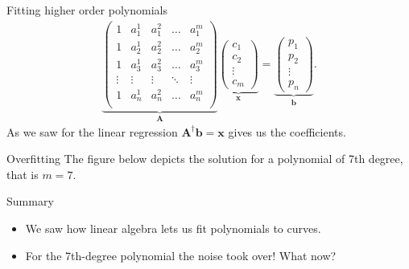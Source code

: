 \documentclass[notes]{beamer}
\begin{document}
    \begin{frame}{Fitting higher order polynomials}
      \begin{align}
        \underbrace{
        \begin{pmatrix}
          1       & a_1^1    & a_1^2  & \dots & a_1^m  \\ 
          1       & a_2^1    & a_2^2  & \dots & a_2^m  \\
          1       & a_3^1    & a_3^2  & \dots & a_3^m  \\
          \vdots  & \vdots    & \vdots  & \ddots & \vdots \\ 
          1       & a_n^1    & a_n^2  & \dots & a_n^m  \\
        \end{pmatrix}
        }_{\mathbf{A}}
        \underbrace{
        \begin{pmatrix}
          c_1 \\ c_2 \\ \vdots \\ c_m  
        \end{pmatrix}
        }_{\mathbf{x}}
        =
        \underbrace{
        \begin{pmatrix}
          p_1 \\
          p_2 \\
          \vdots \\ 
          p_n  
        \end{pmatrix}
        }_{\mathbf{b}}
        .
      \end{align}
      As we saw for the linear regression $\mathbf{A}^{\dagger}\mathbf{b} = \mathbf{x}$
      gives us the coefficients.
    \end{frame}

    \begin{frame}{Overfitting}
      The figure below depicts the solution for a polynomial of 7th degree, that is $m=7$.
      \begin{figure}
        \centering
        
      \end{figure}
    \end{frame}

    \begin{frame}{Summary}
      \begin{itemize}
        \item We saw how linear algebra lets us fit polynomials to curves. 
        \item For the 7th-degree polynomial the noise took over! What now?
      \end{itemize}
    \end{frame}
\end{document}
